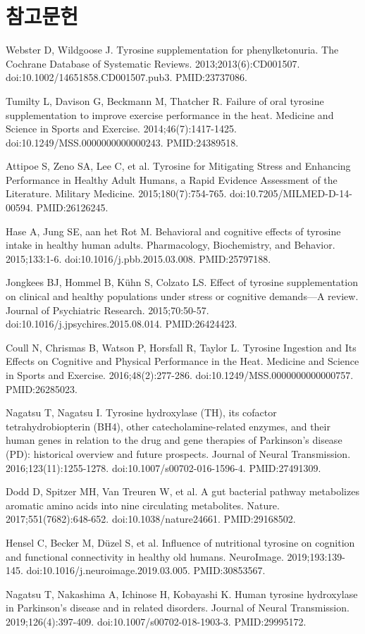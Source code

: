 \documentclass[11pt,oneside]{book}
\newcommand{\refstart}{\par\begingroup\footnotesize\setlength{\parskip}{2.5pt}\raggedright}
\newcommand{\reff}[2]{\par\hangindent=7mm\hangafter=1\noindent[#1]\hspace{2mm}#2\par}
\begin{document}
\section*{참고문헌}
\refstart
\reff{1}{Webster D, Wildgoose J. Tyrosine supplementation for phenylketonuria. The Cochrane Database of Systematic Reviews. 2013;2013(6):CD001507. doi:10.1002/14651858.CD001507.pub3. PMID:23737086.}
\reff{2}{Tumilty L, Davison G, Beckmann M, Thatcher R. Failure of oral tyrosine supplementation to improve exercise performance in the heat. Medicine and Science in Sports and Exercise. 2014;46(7):1417-1425. doi:10.1249/MSS.0000000000000243. PMID:24389518.}
\reff{3}{Attipoe S, Zeno SA, Lee C, et al. Tyrosine for Mitigating Stress and Enhancing Performance in Healthy Adult Humans, a Rapid Evidence Assessment of the Literature. Military Medicine. 2015;180(7):754-765. doi:10.7205/MILMED-D-14-00594. PMID:26126245.}
\reff{4}{Hase A, Jung SE, aan het Rot M. Behavioral and cognitive effects of tyrosine intake in healthy human adults. Pharmacology, Biochemistry, and Behavior. 2015;133:1-6. doi:10.1016/j.pbb.2015.03.008. PMID:25797188.}
\reff{5}{Jongkees BJ, Hommel B, Kühn S, Colzato LS. Effect of tyrosine supplementation on clinical and healthy populations under stress or cognitive demands—A review. Journal of Psychiatric Research. 2015;70:50-57. doi:10.1016/j.jpsychires.2015.08.014. PMID:26424423.}
\reff{6}{Coull N, Chrismas B, Watson P, Horsfall R, Taylor L. Tyrosine Ingestion and Its Effects on Cognitive and Physical Performance in the Heat. Medicine and Science in Sports and Exercise. 2016;48(2):277-286. doi:10.1249/MSS.0000000000000757. PMID:26285023.}
\reff{7}{Nagatsu T, Nagatsu I. Tyrosine hydroxylase (TH), its cofactor tetrahydrobiopterin (BH4), other catecholamine-related enzymes, and their human genes in relation to the drug and gene therapies of Parkinson's disease (PD): historical overview and future prospects. Journal of Neural Transmission. 2016;123(11):1255-1278. doi:10.1007/s00702-016-1596-4. PMID:27491309.}
\reff{8}{Dodd D, Spitzer MH, Van Treuren W, et al. A gut bacterial pathway metabolizes aromatic amino acids into nine circulating metabolites. Nature. 2017;551(7682):648-652. doi:10.1038/nature24661. PMID:29168502.}
\reff{9}{Hensel C, Becker M, Düzel S, et al. Influence of nutritional tyrosine on cognition and functional connectivity in healthy old humans. NeuroImage. 2019;193:139-145. doi:10.1016/j.neuroimage.2019.03.005. PMID:30853567.}
\reff{10}{Nagatsu T, Nakashima A, Ichinose H, Kobayashi K. Human tyrosine hydroxylase in Parkinson's disease and in related disorders. Journal of Neural Transmission. 2019;126(4):397-409. doi:10.1007/s00702-018-1903-3. PMID:29995172.}
\end{document}
